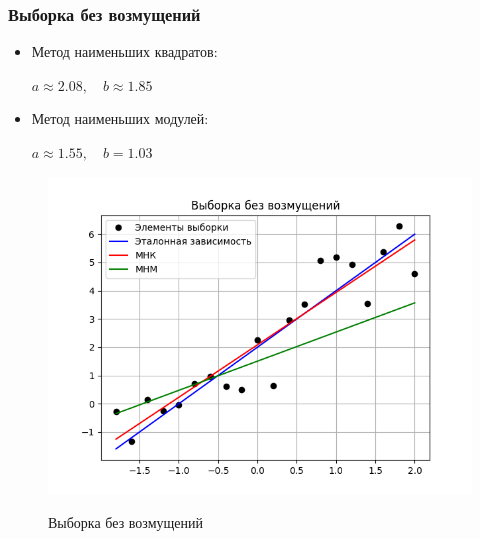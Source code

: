 \documentclass[12pt,a4paper]{article}
\begin{document}
			\subsubsection{Выборка без возмущений}
				\begin{itemize}
					\item Метод наименьших квадратов:
					\begin{center}
						$a \approx 2.08, \quad b \approx 1.85$
					\end{center}
					\item Метод наименьших модулей:
					\begin{center}
						$a \approx 1.55, \quad b=1.03$
					\end{center}
				\end{itemize}
				\begin{figure}[h!]
					{\includegraphics[width=1\linewidth]{../plots/default.png}}
					\caption{Выборка без возмущений}
				\end{figure}
			\clearpage
			
\end{document}
